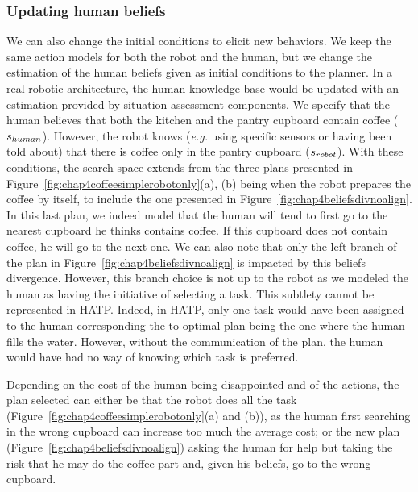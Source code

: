 \documentclass[a4paper,11pt,twoside]{StyleThese}
\begin{document}
\subsubsection{Updating human beliefs}
We can also change the initial conditions to elicit new behaviors. We keep the same action models for both the robot and the human, but we change the estimation of the human beliefs given as initial conditions to the planner. In a real robotic architecture, the human knowledge base would be updated with an estimation provided by situation assessment components. We specify that the human believes that both the kitchen and the pantry cupboard contain coffee ($s_{human}$). However, the robot knows (\textit{e.g.} using specific sensors or having been told about) that there is coffee only in the pantry cupboard ($s_{robot}$). With these conditions, the search space extends from the three plans presented in Figure~\ref{fig:chap4coffeesimplerobotonly}(a), (b) being when the robot prepares the coffee by itself, to include the one presented in Figure~\ref{fig:chap4beliefsdivnoalign}. In this last plan, we indeed model that the human will tend to first go to the nearest cupboard he thinks contains coffee. If this cupboard does not contain coffee, he will go to the next one. We can also note that only the left branch of the plan in Figure~\ref{fig:chap4beliefsdivnoalign} is impacted by this beliefs divergence. However, this branch choice is not up to the robot as we modeled the human as having the initiative of selecting a task. This subtlety cannot be represented in HATP. Indeed, in HATP, only one task would have been assigned to the human corresponding the to optimal plan being the one where the human fills the water. However, without the communication of the plan, the human would have had no way of knowing which task is preferred.

Depending on the cost of the human being disappointed and of the actions, the plan selected can either be that the robot does all the task (Figure~\ref{fig:chap4coffeesimplerobotonly}(a) and (b)), as the human first searching in the wrong cupboard can increase too much the average cost; or the new plan (Figure~\ref{fig:chap4beliefsdivnoalign}) asking the human for help but taking the risk that he may do the coffee part and, given his beliefs, go to the wrong cupboard.
\end{document}
